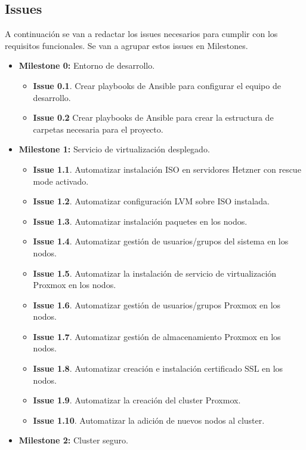 	\subsection{Issues}
	\begin{text}
		A continuación se van a redactar los issues necesarios para cumplir con los requisitos funcionales. Se van a agrupar estos issues en Milestones.
		
		\begin{itemize}
			\item \textbf{Milestone 0:} Entorno de desarrollo. 
				\begin{itemize}
					\item \textbf{Issue 0.1}. Crear playbooks de Ansible para configurar el equipo de desarrollo.
					\item \textbf{Issue 0.2} Crear playbooks de Ansible para crear la estructura de carpetas necesaria para el proyecto.
				\end{itemize}
			\item \textbf{Milestone 1:} Servicio de virtualización desplegado. 
				\begin{itemize}
					\item \textbf{Issue 1.1}. Automatizar instalación ISO en servidores Hetzner con rescue mode activado.
					\item \textbf{Issue 1.2}. Automatizar configuración LVM sobre ISO instalada.
					\item \textbf{Issue 1.3}. Automatizar instalación paquetes en los nodos.
					\item \textbf{Issue 1.4}. Automatizar gestión de usuarios/grupos del sistema en los nodos.
					\item \textbf{Issue 1.5}. Automatizar la instalación de servicio de virtualización Proxmox en los nodos.
					\item \textbf{Issue 1.6}. Automatizar gestión de usuarios/grupos Proxmox en los nodos.
					\item \textbf{Issue 1.7}. Automatizar gestión de almacenamiento Proxmox en los nodos.
					\item \textbf{Issue 1.8}. Automatizar creación e instalación certificado SSL en los nodos.
					\item \textbf{Issue 1.9}. Automatizar la creación del cluster Proxmox.
					\item \textbf{Issue 1.10}. Automatizar la adición de nuevos nodos al cluster.
				\end{itemize}
			\item \textbf{Milestone 2:} Cluster seguro.

\end{itemize}
\end{text}
